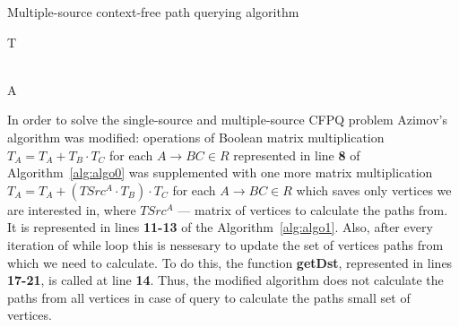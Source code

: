 \begin{algorithm}
\begin{algorithmic}[1]
\caption{Multiple-source context-free path querying algorithm}
\label{alg:algo1}
    

     
    \EndFor

     
        \EndFor
    \EndFor

     
        \EndFor
    \EndWhile
    \State \Return T
\EndFunction

\\

    \EndFor
    \State \Return A
\EndFunction
\end{algorithmic}
\end{algorithm}
In order to solve the single-source and multiple-source CFPQ problem Azimov's algorithm was modified: operations of Boolean matrix multiplication $T_A = T_A + T_B \cdot T_C$ for each $A \rightarrow BC \in R$ represented in line \textbf{8} of Algorithm~\ref{alg:algo0} was supplemented with one more matrix multiplication $T_A = T_A + (TSrc^A \cdot T_B) \cdot T_C$ for each $A \rightarrow BC \in R$ which saves only vertices we are interested in, where $TSrc^A$ --- matrix of vertices to calculate the paths from. It is represented in lines \textbf{11-13} of the Algorithm~\ref{alg:algo1}. Also, after every iteration of while loop this is nessesary to update the set of vertices paths from which we need to calculate. To do this, the function \textbf{getDst}, represented in lines \textbf{17-21}, is called at line \textbf{14}. Thus, the modified algorithm does not calculate the paths from all vertices in case of query to calculate the paths small set of vertices.

